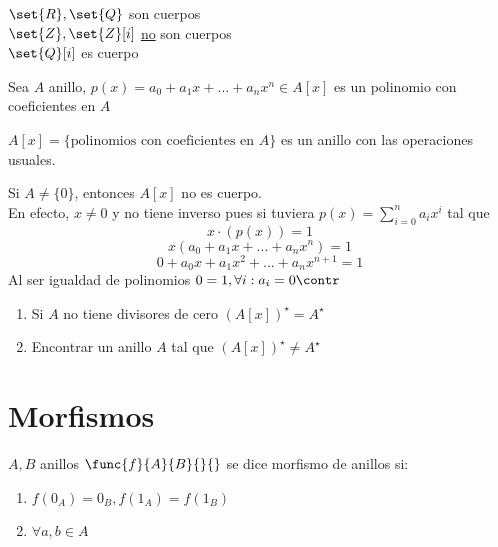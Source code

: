 \documentclass[11pt]{book}
\begin{document}
    \begin{ejm}
        $\set{R},\set{Q}$ son cuerpos\\
        $\set{Z},\set{Z}[i]$ \underline{no} son cuerpos\\
        $\set{Q}[i]$ es cuerpo
    \end{ejm}

    \begin{defn}
        Sea $A$ anillo, $p(x)=a_0+a_1x+...+a_nx^n\in A[x]$ es un polinomio con coeficientes en $A$
    \end{defn}

    \begin{prop}
        $A[x]=\{\text{polinomios con coeficientes en }A\}$ es un anillo con las operaciones usuales.
    \end{prop}

    \begin{obs}
        Si $A\neq\{0\}$, entonces $A[x]$ no es cuerpo.\\
        En efecto, $x\neq 0$ y no tiene inverso pues si tuviera $p(x)=\sum^n_{i=0}a_ix^i$ tal que
        \[x\cdot(p(x))=1\]
        \[x(a_0+a_1x+...+a_nx^n)=1\]
        \[0+a_0x+a_1x^2+...+a_nx^{n+1}=1\]
        Al ser igualdad de polinomios $0=1,\forall i:a_i=0\contr$
    \end{obs}

    \begin{eje}
        \begin{enumerate}
            \item Si $A$ no tiene divisores de cero $(A[x])^\star=A^\star$

            \item Encontrar un anillo $A$ tal que $(A[x])^\star\neq A^\star$
        \end{enumerate}
    \end{eje}

    \section{Morfismos}
    $A,B$ anillos $\func{f}{A}{B}{}{}$ se dice morfismo de anillos si:
    \begin{enumerate}
        \item $f(0_A)=0_B, f(1_A)=f(1_B)$

        \item $\forall a,b\in A$
    \end{enumerate}

\end{document}

